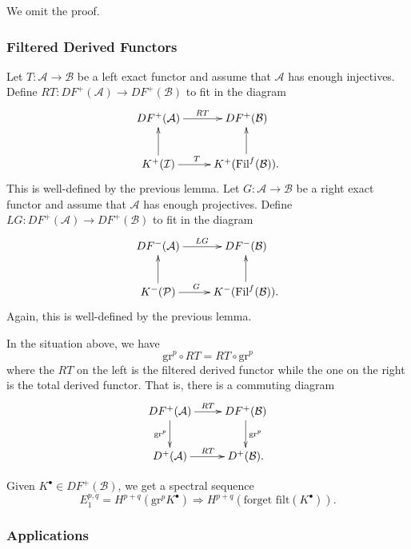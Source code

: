 We omit the proof.

\subsubsection{Filtered Derived Functors}

\begin{definition}
Let $T: \mathcal{A} \to \mathcal{B}$ be a left exact functor and assume that $\mathcal{A}$ has enough injectives.  Define $RT: D F^+(\mathcal{A}) \to D F^+(\mathcal{B})$ to fit in the diagram
$$
\xymatrix{ 
D F^+(\mathcal{A}) \ar^{RT}[r] & D F^+(\mathcal{B}) \\
K^+(\mathcal{I}) \ar[u] \ar[r]^{T \quad} & K^+(\text{Fil}^f(\mathcal{B})). \ar[u]}
$$
This is well-defined by the previous lemma. Let $G: \mathcal{A} \to \mathcal{B}$ be a right exact functor  and assume that $\mathcal{A}$ has enough projectives.  Define $LG: D F^+(\mathcal{A}) \to D F^+(\mathcal{B})$ to fit in the diagram
$$
\xymatrix{ 
D F^-(\mathcal{A}) \ar^{LG}[r] & D F^-(\mathcal{B}) \\
K^-(\mathcal{P}) \ar[u] \ar[r]^{G \quad} & K^-(\text{Fil}^f(\mathcal{B})). \ar[u]}
$$
Again, this is well-defined by the previous lemma.
\end{definition}

\begin{proposition}
In the situation above, we have
$$
\mathrm{gr}^p \circ RT = RT \circ \mathrm{gr}^p
$$
where the $RT$ on the left is the filtered derived functor while the one on the right is the total derived functor. That is, there is a commuting diagram
$$
\xymatrix{
D F^+(\mathcal{A}) \ar[r]^{RT} \ar[d]_{\text{gr}^p} & D F^+(\mathcal{B}) \ar[d]^{\text{gr}^p}\\
D^+(\mathcal{A}) \ar[r]^{RT} & D^+(\mathcal{B}).}
$$
\end{proposition}

Given $K^\bullet \in D F^+(\mathcal{B})$, we get a spectral sequence 
$$
E_1^{p,q} = H^{p+q}(\text{gr}^p K^\bullet) \Rightarrow H^{p+q}(\text{forget filt}(K^\bullet)).
$$

\subsubsection{Applications}

